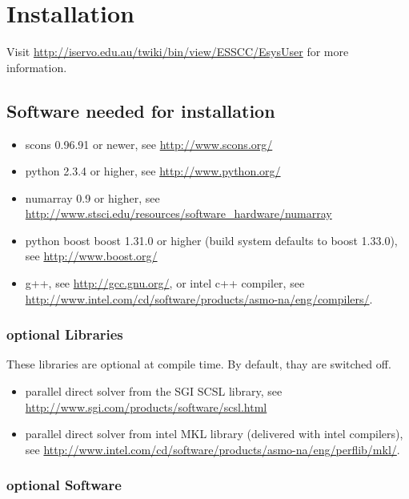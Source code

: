 %
%
\chapter{Installation}
\label{INSTALL}

Visit \url{http://iservo.edu.au/twiki/bin/view/ESSCC/EsysUser} for more information.

\section{Software needed for installation}

\begin{itemize}
   \item scons  0.96.91 or newer, see \url{http://www.scons.org/}
   \item python  2.3.4 or higher, see \url{http://www.python.org/}
   \item numarray  0.9 or higher, see \url{http://www.stsci.edu/resources/software_hardware/numarray}
   \item python boost boost  1.31.0 or higher (build system defaults to boost 1.33.0), see \url{http://www.boost.org/}
   \item g++, see \url{http://gcc.gnu.org/}, or intel c++  compiler, see \\
\url{http://www.intel.com/cd/software/products/asmo-na/eng/compilers/}.
\end{itemize}

\subsection{optional Libraries}
These libraries are optional at compile time. By default, thay are switched off.
\begin{itemize}
   \item parallel direct solver from the SGI SCSL library, see \url{http://www.sgi.com/products/software/scsl.html} 
   \item parallel direct solver from intel MKL library  (delivered with intel compilers), see \url{http://www.intel.com/cd/software/products/asmo-na/eng/perflib/mkl/}.
\end{itemize}

\subsection{optional Software}

